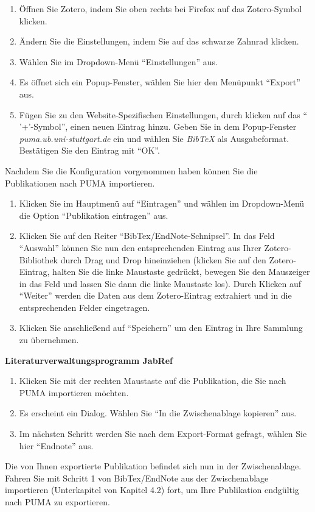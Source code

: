 \begin{enumerate}
    \item Öffnen Sie Zotero, indem Sie oben rechts bei Firefox auf das Zotero-Symbol klicken.
    \item Ändern Sie die Einstellungen, indem Sie auf das schwarze Zahnrad klicken. 
    \item Wählen Sie im Dropdown-Menü \enquote{Einstellungen} aus.
    \item Es öffnet sich ein Popup-Fenster, wählen Sie hier den Menüpunkt \enquote{Export} aus. 
    \item Fügen Sie zu den Website-Spezifischen Einstellungen, durch klicken auf das \enquote{ '+'-Symbol}, einen neuen Eintrag hinzu. Geben Sie in dem Popup-Fenster \textit{puma.ub.uni-stuttgart.de} ein und wählen Sie \textit{BibTeX} als Ausgabeformat. Bestätigen Sie den Eintrag mit \enquote{OK}. 
\end{enumerate}
Nachdem Sie die Konfiguration vorgenommen haben können Sie die Publikationen nach PUMA importieren. 
\begin{enumerate}
    \item Klicken Sie im Hauptmenü auf \enquote{Eintragen} und wählen im Dropdown-Menü die Option \enquote{Publikation eintragen} aus.  
    \item Klicken Sie auf den Reiter \enquote{BibTex/EndNote-Schnipsel}. In das Feld \enquote{Auswahl} können Sie nun den entsprechenden Eintrag aus Ihrer Zotero-Bibliothek durch Drag und Drop hineinziehen (klicken Sie auf den Zotero-Eintrag, halten Sie die linke Maustaste gedrückt, bewegen Sie den Mauszeiger in das Feld und lassen Sie dann die linke Maustaste los). Durch Klicken auf \enquote{Weiter} werden die Daten aus dem Zotero-Eintrag extrahiert und in die entsprechenden Felder eingetragen. 
    \item Klicken Sie anschließend auf \enquote{Speichern} um den Eintrag in Ihre Sammlung zu übernehmen.
\end{enumerate}  
\textbf{Literaturverwaltungsprogramm JabRef}
\begin{enumerate}
    \item Klicken Sie mit der rechten Maustaste auf die Publikation, die Sie nach PUMA importieren möchten.
    \item Es erscheint ein Dialog. Wählen Sie \enquote{In die Zwischenablage kopieren} aus.
    \item Im nächsten Schritt werden Sie nach dem Export-Format gefragt, wählen Sie hier \enquote{Endnote} aus.
\end{enumerate}
Die von Ihnen exportierte Publikation befindet sich nun in der Zwischenablage. Fahren Sie mit Schritt 1 von BibTex/EndNote aus der Zwischenablage importieren (Unterkapitel von Kapitel 4.2) fort, um Ihre Publikation endgültig nach PUMA zu exportieren.

